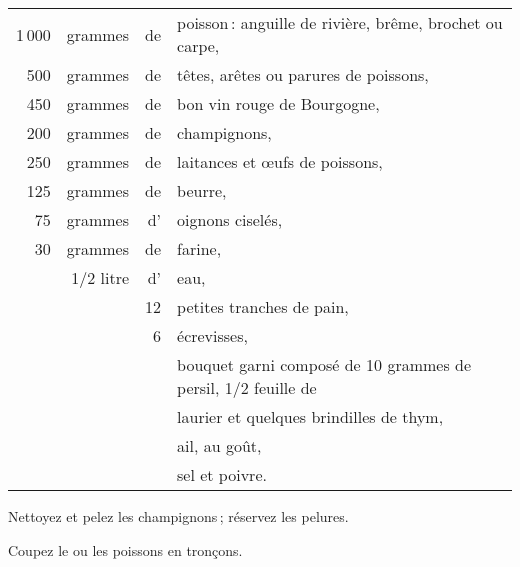 \footnotesize
\begin{longtable}{rrrp{16em}}
  1 000 & grammes   & de & poisson : anguille de rivière, brême, brochet ou carpe,                        \\
    500 & grammes   & de & têtes, arêtes ou parures de poissons,                                          \\
    450 & grammes   & de & bon vin rouge de Bourgogne,                                                    \\
    200 & grammes   & de & champignons,                                                                   \\
    250 & grammes   & de & laitances et œufs de poissons,                                                 \\
    125 & grammes   & de & beurre,                                                                        \\
     75 & grammes   & d' & oignons ciselés,                                                               \\
     30 & grammes   & de & farine,                                                                        \\
        & 1/2 litre & d' & eau,                                                                           \\
        &           & 12 & petites tranches de pain,                                                      \\
        &           &  6 & écrevisses,                                                                    \\
        &           &    & bouquet garni composé de 10 grammes de persil, 1/2 feuille de                  \\
        &           &    & laurier et quelques brindilles de thym,                                        \\
        &           &    & ail, au goût,                                                                  \\
        &           &    & sel et poivre.                                                                 \\
\end{longtable}
\normalsize

Nettoyez et pelez les champignons ; réservez les pelures.

Coupez le ou les poissons en tronçons.

